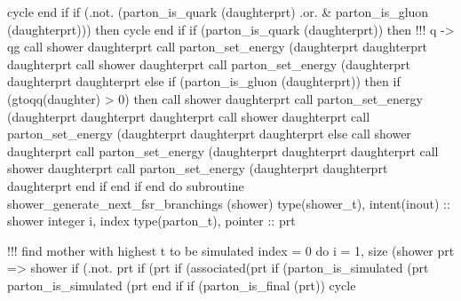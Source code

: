       cycle
   end if
   if (.not. (parton_is_quark (daughterprt) .or. &
        parton_is_gluon (daughterprt))) then
      cycle
   end if
   if (parton_is_quark (daughterprt)) then
      !!! q -> qg
      call shower%
      daughterprt%
      call parton_set_energy (daughterprt%
           daughterprt%
      daughterprt%
      call shower%
      daughterprt%
      call parton_set_energy (daughterprt%
           daughterprt%
      daughterprt%
   else if (parton_is_gluon (daughterprt)) then
      if (gtoqq(daughter) > 0) then
         call shower%
         daughterprt%
         call parton_set_energy (daughterprt%
              daughterprt%
         daughterprt%
         call shower%
         daughterprt%
         call parton_set_energy (daughterprt%
              daughterprt%
         daughterprt%
      else
         call shower%
         daughterprt%
         call parton_set_energy (daughterprt%
              daughterprt%
         daughterprt%
         call shower%
         daughterprt%
         call parton_set_energy (daughterprt%
              daughterprt%
         daughterprt%
      end if
   end if
end do
\nwendcode{}\nwdocspar
\nwenddocs{}\plusendmoddef
  subroutine shower_generate_next_fsr_branchings (shower)
    type(shower_t), intent(inout) :: shower
    integer i, index
    type(parton_t),  pointer :: prt

    !!! find mother with highest t to be simulated
    index = 0
    do i = 1, size (shower%
       prt => shower%
       if (.not. prt%
       if (prt%
       if (associated(prt%
          if (parton_is_simulated (prt%
              parton_is_simulated (prt%
       end if
       if (parton_is_final (prt)) cycle

